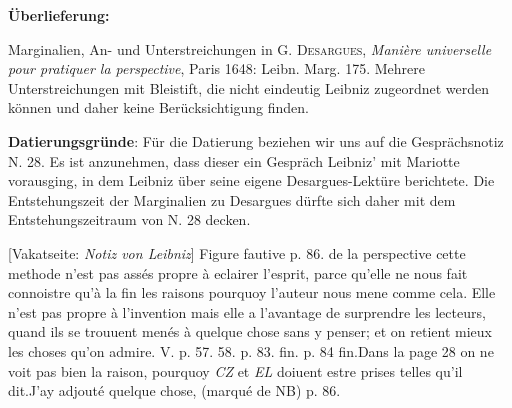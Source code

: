       
               
                \begin{ledgroupsized}[r]{120mm}
                \footnotesize 
                \pstart                
                \noindent\textbf{\"{U}berlieferung:}   
                \pend
                \end{ledgroupsized}
            
              
                            \begin{ledgroupsized}[r]{114mm}
                            \footnotesize 
                            \pstart \parindent -6mm
                            Marginalien, An- und Unterstreichungen in \textsc{G. Desargues}, \cite{00034}\textit{Mani\`{e}re universelle pour pratiquer la perspective}, Paris 1648: Leibn. Marg. 175. Mehrere Unterstreichungen mit Bleistift, die nicht eindeutig Leibniz zugeordnet werden k\"{o}nnen und daher keine Ber\"{u}cksichtigung finden. \pend
                            \end{ledgroupsized}
                \vspace*{5mm}
                \begin{ledgroup}
                \footnotesize 
                \pstart
            \noindent\footnotesize{\textbf{Datierungsgr\"{u}nde}: F\"{u}r die Datierung beziehen wir uns auf die Gespr\"{a}chsnotiz N. 28. Es ist anzunehmen, dass dieser ein Gespr\"{a}ch Leibniz' mit Mariotte\protect{} vorausging, in dem Leibniz \"{u}ber seine eigene Desargues-Lekt\"{u}re berichtete. Die Entstehungszeit der Marginalien zu Desargues d\"{u}rfte sich daher mit dem Entstehungszeitraum von N. 28 decken.}
                \pend
                \end{ledgroup}
            
                \vspace*{8mm}
                \pstart 
                \normalsize
           [Vakatseite: \textit{Notiz von Leibniz}] Figure fautive p. 86. de la perspective  cette methode n'est pas ass\'{e}s propre \`{a} eclairer l'esprit, parce qu'elle ne nous fait connoistre qu'\`{a} la fin les raisons pourquoy l'auteur nous mene comme cela. Elle n'est pas  propre \`{a} l'invention mais elle a l'avantage de surprendre les lecteurs, quand ils se trouuent men\'{e}s \`{a} quelque chose sans y penser; et on retient mieux les choses qu'on admire. V. p. 57. 58. p. 83. fin. p. 84 fin.\pend \pstart  Dans la page 28 on ne voit pas bien  la raison, pourquoy \textit{CZ} et \textit{EL} doiuent estre prises telles qu'il dit.\pend \pstart J'ay adjout\'{e} quelque chose, (marqu\'{e} de NB) p. 86.